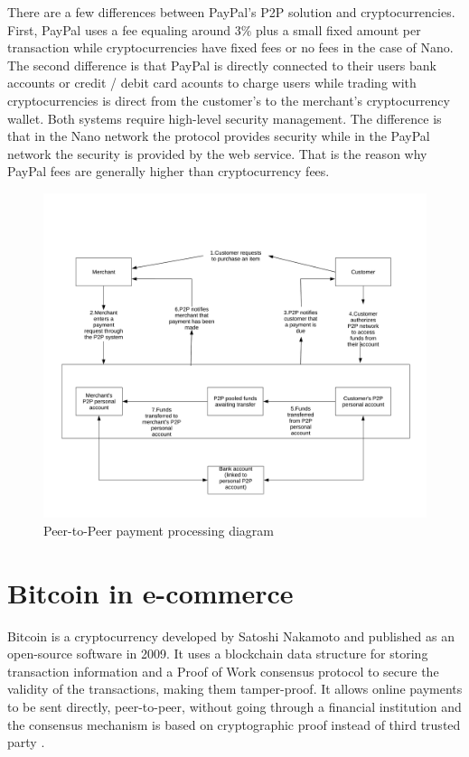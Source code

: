 \documentclass{ferseminar}
\begin{document}
There are a few differences between PayPal's P2P solution and cryptocurrencies. First, PayPal uses a fee equaling around 3\% plus a small fixed amount per transaction while cryptocurrencies have fixed fees or no fees in the case of Nano. The second difference is that PayPal is directly connected to their users bank accounts or credit / debit card acounts to charge users while trading with cryptocurrencies is direct from the customer's to the merchant's cryptocurrency wallet. Both systems require high-level security management. The difference is that in the Nano network the protocol provides security while in the PayPal network the security is provided by the web service. That is the reason why PayPal fees are generally higher than cryptocurrency fees.

\begin{figure}[h!]
	\caption{Peer-to-Peer payment processing diagram}
	\includegraphics[scale=0.215]{diagram3}
	\centering
\end{figure}
\FloatBarrier

\section{Bitcoin in e-commerce}

Bitcoin is a cryptocurrency developed by Satoshi Nakamoto and published as an open-source software in 2009. It uses a blockchain data structure for storing transaction information and a Proof of Work consensus protocol to secure the validity of the transactions, making them tamper-proof. It allows online payments to be sent directly, peer-to-peer, without going through a financial institution and the consensus mechanism is based on cryptographic proof instead of third trusted party \cite{Bitcoin}.
\end{document}
